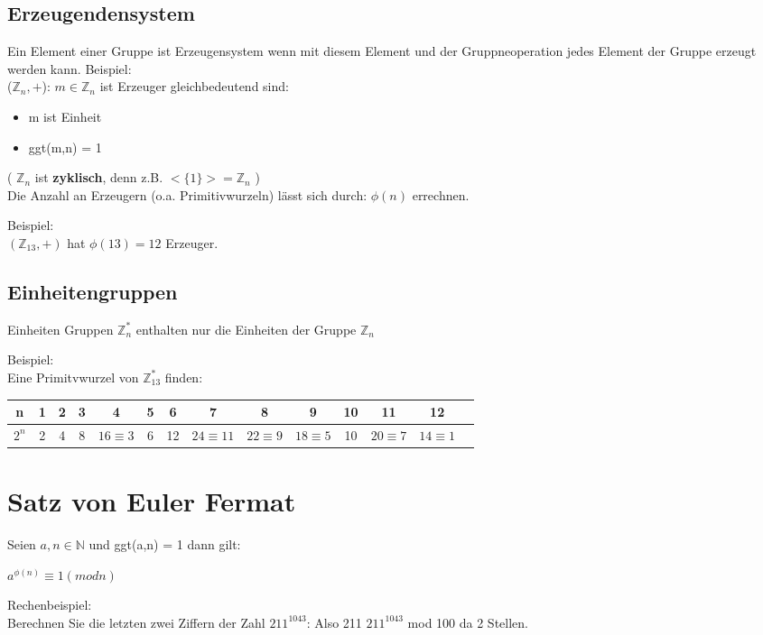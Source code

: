 \documentclass[12pt, letterpaper, twoside]{article}
\begin{document}
\subsection{Erzeugendensystem}
Ein Element einer Gruppe ist Erzeugensystem wenn mit diesem Element und der Gruppneoperation jedes Element der Gruppe erzeugt werden kann.
Beispiel: \\
($\mathbb{Z}_n , + $): $ m \in \mathbb{Z}_n $ ist Erzeuger gleichbedeutend sind:
\begin{itemize}
	\item m ist Einheit
	\item ggt(m,n) = 1
\end{itemize}

\noindent
( $ \mathbb{Z}_n $ ist \textbf{zyklisch}, denn z.B. $ <\{1\}>  =  \mathbb{Z}_n $ ) \\

\noindent
Die Anzahl an Erzeugern (o.a. Primitivwurzeln) lässt sich durch: $ \phi (n) $ errechnen.

Beispiel: \\
\indent
$ ( \mathbb{Z}_{13}, +)$ hat $ \phi(13) = 12 $ Erzeuger.



\subsection{Einheitengruppen}
Einheiten Gruppen $\mathbb{Z}_{n}^* $ enthalten nur die Einheiten der Gruppe $ \mathbb{Z}_n $

Beispiel: \\
Eine Primitvwurzel von $ \mathbb{Z}_{13}^* $ finden: \\
\begin{tabular}{c | c c c c c c c c c c c c c}
n & 1 & 2 & 3 & 4 & 5 & 6 & 7 & 8 & 9 & 10 & 11 & 12 \\
\hline
$ 2^n $& 2 & 4 & 8 & $ 16 \equiv 3 $ & 6 & 12 & $ 24 \equiv 11 $& $ 22 \equiv 9$ & $18 \equiv 5$ & 10 & $20 \equiv 7$ & $14 \equiv 1$ \\
\end{tabular}


\section{Satz von Euler Fermat}
Seien $ a,n \in  \mathbb{N} $ und ggt(a,n) = 1 dann gilt: \\
\begin{center}
$ a^{\phi (n)} \equiv 1 (mod n) $ \\
\end{center}
Rechenbeispiel: \\
Berechnen Sie die letzten zwei Ziffern der Zahl $ 211^{1043} $:
Also 211 $ 211^{1043} $ mod 100 da 2 Stellen.
\end{document}
